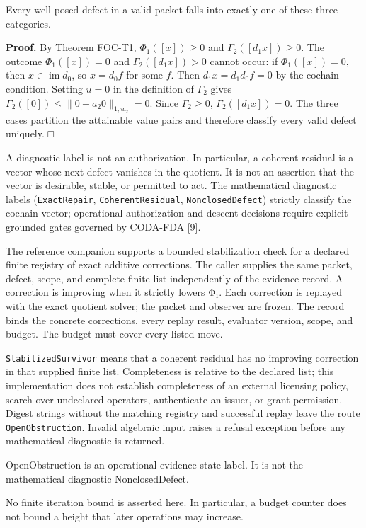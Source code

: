\documentclass[
  11pt,
]{article}
\begin{document}
Every well-posed defect in a valid packet falls into exactly one of these three categories.

\textbf{Proof.} By Theorem FOC-T1, \(\Phi_1([x])\ge 0\) and \(\Gamma_2([d_1 x])\ge 0\). The outcome \(\Phi_1([x])=0\) and \(\Gamma_2([d_1 x])>0\) cannot occur: if \(\Phi_1([x])=0\), then \(x\in\operatorname{im} d_0\), so \(x=d_0 f\) for some \(f\). Then \(d_1 x=d_1 d_0 f=0\) by the cochain condition. Setting \(u=0\) in the definition of \(\Gamma_2\) gives \(\Gamma_2([0])\le\|0+a_2 0\|_{1,w_2}=0\). Since \(\Gamma_2\ge 0\), \(\Gamma_2([d_1 x])=0\). The three cases partition the attainable value pairs and therefore classify every valid defect uniquely. □

A diagnostic label is not an authorization. In particular, a coherent residual is a vector whose next defect vanishes in the quotient. It is not an assertion that the vector is desirable, stable, or permitted to act. The mathematical diagnostic labels (\texttt{ExactRepair}, \texttt{CoherentResidual}, \texttt{NonclosedDefect}) strictly classify the cochain vector; operational authorization and descent decisions require explicit grounded gates governed by CODA-FDA {[}9{]}.

The reference companion supports a bounded stabilization check for a declared finite registry of exact additive corrections. The caller supplies the same packet, defect, scope, and complete finite list independently of the evidence record. A correction is improving when it strictly lowers Φ₁. Each correction is replayed with the exact quotient solver; the packet and observer are frozen. The record binds the concrete corrections, every replay result, evaluator version, scope, and budget. The budget must cover every listed move.

\texttt{StabilizedSurvivor} means that a coherent residual has no improving correction in that supplied finite list. Completeness is relative to the declared list; this implementation does not establish completeness of an external licensing policy, search over undeclared operators, authenticate an issuer, or grant permission. Digest strings without the matching registry and successful replay leave the route \texttt{OpenObstruction}. Invalid algebraic input raises a refusal exception before any mathematical diagnostic is returned.

OpenObstruction is an operational evidence-state label. It is not the mathematical diagnostic NonclosedDefect.

No finite iteration bound is asserted here. In particular, a budget counter does not bound a height that later operations may increase.
\end{document}
